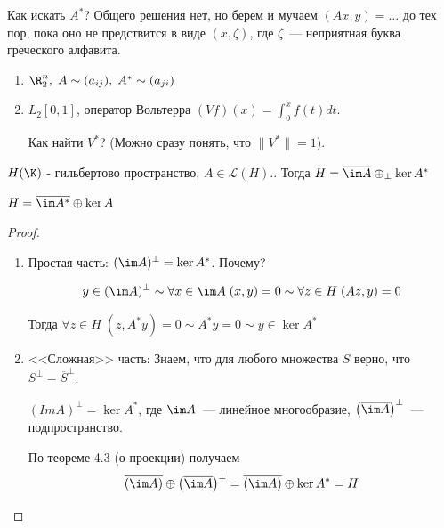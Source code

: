 \begin{lemmanote}
    Как искать $A^*$? Общего решения нет, но берем и мучаем $(Ax, y) = \ldots$ до тех пор, пока оно не предствится в виде $(x, \zeta)$, 
    где $\zeta$~--- неприятная буква греческого алфавита.
\end{lemmanote}

\begin{example}
\begin{enumerate}
    \item $\R^n_2, \; A \sim (a_{ij}), \; A^* \sim (a_{ji})$
    \item $L_2[0,1]$, оператор Вольтерра $(V f)(x) = \int_0^x f(t) dt$.
    
    Как найти $V^*$? (Можно сразу понять, что $\|V^*\| = 1$).
\end{enumerate}
\end{example}

\begin{theorem}[9.2]
    $H(\K)$ - гильбертово пространство, $A \in \mathcal{L}(H)$.. 
    Тогда $H = \overline{\im A} \oplus_{\perp} \ker A^*$
\end{theorem}

\begin{note}
$H = \overline{\im A^*} \oplus \ker A$
\end{note}

\begin{proof}
    \begin{enumerate}
        \item Простая часть: $(\im A)^\perp = \ker A^*$. Почему?

        \[ y \in (\im A)^\perp \sim \forall x \in \im A \; (x,y)=0 \sim \forall z \in H \; (Az, y)=0\]

        Тогда $\forall z \in H \; (z, A^*y)=0 \sim A^*y=0 \sim y \in \ker A^*$
        \item <<Сложная>> часть:
        Знаем, что для любого множества $S$ верно, что $S^{\perp} = \overline{S}^{\perp}$.

        $(Im A)^{\perp} = \ker A^*$, где $\im A$~--- линейное многообразие,
        $\left( \overline{\im A} \right)^{\perp}$~--- подпространство.

        По теореме 4.3 (о проекции) получаем 
        \[ \overline{(\im A)} \oplus \left( \overline{\im A} \right)^{\perp}=\overline{(\im A)} \oplus \ker A^* = H \]
    \end{enumerate}
\end{proof}

